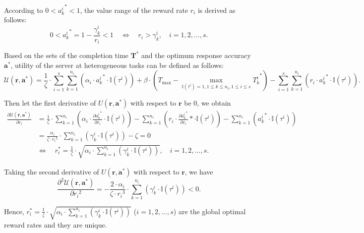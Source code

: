\documentclass[final,1p,times]{elsarticle}
\begin{document}
According to $0<{a_k^i}^\ast<1$, the value range of the reward rate $r_i$ is derived as follows:
\begin{equation}
	0 < {a_k^i}^\ast = 1 - \frac{\gamma_k^i}{r_i} < 1\quad
	\Leftrightarrow\quad r_i > \gamma_k^i, \quad i=1,2,\dots,s.
\end{equation}	

Based on the sets of the completion time $\bm{T}^\ast$ and the optimum response accuracy $\bm{a}^\ast$, utility of the server at heterogeneous tasks can be defined as follows:
\begin{equation}
	\mathcal{U}(\bm{r},\bm{a}^\ast) = \frac{1}{\zeta}\cdot \sum_{i=1}^{s}\sum_{k=1}^{n_i}\left(\alpha_i\cdot {a_k^i}^\ast\cdot \mathbb{I}(\tau^i)\right) + \beta\cdot(T_{\max}-\max_{\mathbb{I}(\tau^i)=1,1\le k\le n_i,1\le i\le s}{T_k^i}^\ast) - \sum_{i=1}^{s}\sum_{k=1}^{n_i}\left(r_i\cdot {a_k^i}^\ast\cdot \mathbb{I}(\tau^i)\right).
\end{equation}

Then let the first derivative of $U(\bm{r},\bm{a}^\ast)$ with respect to $\bm{r}$ be $0$, we obtain
\begin{equation}
	\begin{aligned}
		\frac{\partial \mathcal{U}(\bm{r},\bm{a}^\ast)}{\partial r_i} &= \frac{1}{\zeta}\cdot \sum_{k=1}^{n_i}(\alpha_i\cdot \frac{\partial {a_k^i}^\ast}{\partial r_i}\cdot \mathbb{I}(\tau^i)) - \sum_{k=1}^{n_i}(r_i\cdot \frac{\partial {a_k^i}^\ast}{\partial r_i}\ast\cdot \mathbb{I}(\tau^i)) - \sum_{k=1}^{n_i}({a_k^i}^\ast\cdot \mathbb{I}(\tau^i))\\
		&= \frac{\alpha_i}{\zeta\cdot {r_i}^2}\cdot\sum_{k=1}^{n_i}(\gamma_k^i\cdot\mathbb{I}(\tau^i))-\zeta = 0\\
		&\Leftrightarrow\quad r_i^\ast =\frac{1}{\zeta}\cdot\sqrt{\alpha_i\cdot\sum_{k=1}^{n_i}(\gamma_k^i\cdot\mathbb{I}(\tau^i))}, \quad i=1,2,\dots,s.
	\end{aligned}
\end{equation}

Taking the second derivative of $U(\bm{r},\bm{a}^\ast)$ with respect to $\bm{r}$, we have
\begin{equation}
	\frac{\partial^2 \mathcal{U}(\bm{r},\bm{a}^\ast)}{\partial {r_i}^2} = - \frac{2\cdot\alpha_i}{\zeta\cdot {r_i}^3}\cdot\sum_{k=1}^{n_i}(\gamma_k^i\cdot\mathbb{I}(\tau^i)) < 0.
\end{equation}	

Hence, $r_i^\ast =\frac{1}{\zeta}\cdot\sqrt{\alpha_i\cdot\sum_{k=1}^{n_i}(\gamma_k^i\cdot\mathbb{I}(\tau^i))}$ ($i=1,2,\dots,s$) are the global optimal reward rates and they are unique. 
\end{document}
